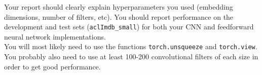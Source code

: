 \documentclass[12pt, letterpaper]{article}
\begin{document}
Your report should clearly explain hyperparameters you used (embedding dimensions, number of filters, etc).  You should report performance on the development and test sets ({\tt aclImdb\_small}) for both your CNN
and feedforward neural network implementations.\\

 You will most likely need to use the functions {\tt torch.unsqueeze} and {\tt torch.view}.  You probably also need to use at least 100-200 convolutional filters of each size in order to get good performance.
\end{document}
